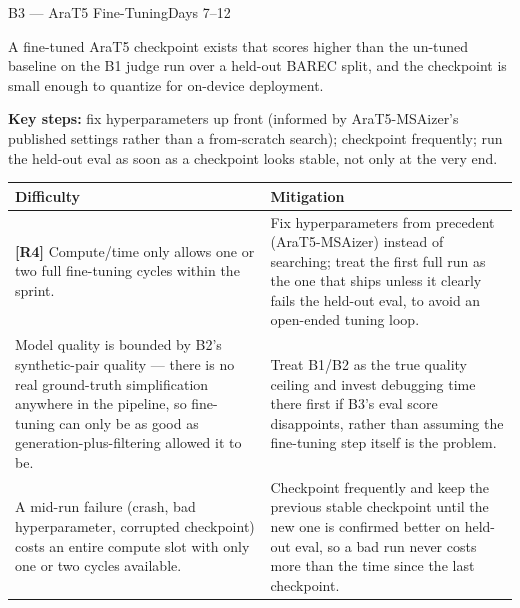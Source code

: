 \documentclass[11pt,a4paper]{article}
\begin{document}
\newpage
\begin{milestonehead}{B3 --- AraT5 Fine-Tuning}{Days 7--12}
\begin{goalbox}
A fine-tuned AraT5 checkpoint exists that scores higher than the un-tuned
baseline on the B1 judge run over a held-out BAREC split, and the checkpoint
is small enough to quantize for on-device deployment.
\end{goalbox}

\textbf{Key steps:} fix hyperparameters up front (informed by AraT5-MSAizer's
published settings rather than a from-scratch search); checkpoint
frequently; run the held-out eval as soon as a checkpoint looks stable,
not only at the very end.

\begin{center}
\small
\begin{tabular}{@{}p{6.3cm}p{6.9cm}@{}}
\toprule
\textbf{Difficulty} & \textbf{Mitigation} \\
\midrule
\textbf{[R4]} Compute/time only allows one or two full fine-tuning cycles
within the sprint. & Fix hyperparameters from precedent (AraT5-MSAizer)
instead of searching; treat the first full run as the one that ships unless
it clearly fails the held-out eval, to avoid an open-ended tuning loop. \\
\addlinespace
Model quality is bounded by B2's synthetic-pair quality --- there is no
real ground-truth simplification anywhere in the pipeline, so fine-tuning
can only be as good as generation-plus-filtering allowed it to be. &
Treat B1/B2 as the true quality ceiling and invest debugging time there
first if B3's eval score disappoints, rather than assuming the fine-tuning
step itself is the problem. \\
\addlinespace
A mid-run failure (crash, bad hyperparameter, corrupted checkpoint) costs
an entire compute slot with only one or two cycles available. &
Checkpoint frequently and keep the previous stable checkpoint until the new
one is confirmed better on held-out eval, so a bad run never costs more
than the time since the last checkpoint. \\
\bottomrule
\end{tabular}
\end{center}
\end{milestonehead}
\end{document}
